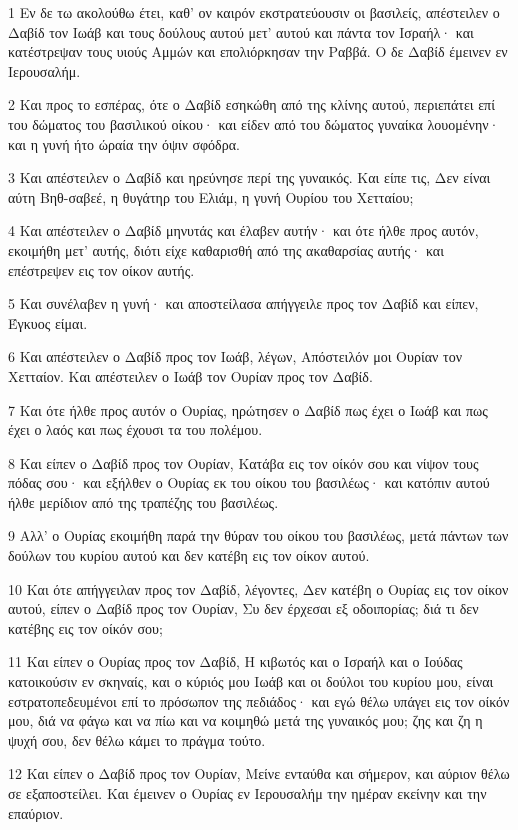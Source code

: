 \par 1 Εν δε τω ακολούθω έτει, καθ' ον καιρόν εκστρατεύουσιν οι βασιλείς, απέστειλεν ο Δαβίδ τον Ιωάβ και τους δούλους αυτού μετ' αυτού και πάντα τον Ισραήλ· και κατέστρεψαν τους υιούς Αμμών και επολιόρκησαν την Ραββά. Ο δε Δαβίδ έμεινεν εν Ιερουσαλήμ.
\par 2 Και προς το εσπέρας, ότε ο Δαβίδ εσηκώθη από της κλίνης αυτού, περιεπάτει επί του δώματος του βασιλικού οίκου· και είδεν από του δώματος γυναίκα λουομένην· και η γυνή ήτο ώραία την όψιν σφόδρα.
\par 3 Και απέστειλεν ο Δαβίδ και ηρεύνησε περί της γυναικός. Και είπε τις, Δεν είναι αύτη Βηθ-σαβεέ, η θυγάτηρ του Ελιάμ, η γυνή Ουρίου του Χετταίου;
\par 4 Και απέστειλεν ο Δαβίδ μηνυτάς και έλαβεν αυτήν· και ότε ήλθε προς αυτόν, εκοιμήθη μετ' αυτής, διότι είχε καθαρισθή από της ακαθαρσίας αυτής· και επέστρεψεν εις τον οίκον αυτής.
\par 5 Και συνέλαβεν η γυνή· και αποστείλασα απήγγειλε προς τον Δαβίδ και είπεν, Έγκυος είμαι.
\par 6 Και απέστειλεν ο Δαβίδ προς τον Ιωάβ, λέγων, Απόστειλόν μοι Ουρίαν τον Χετταίον. Και απέστειλεν ο Ιωάβ τον Ουρίαν προς τον Δαβίδ.
\par 7 Και ότε ήλθε προς αυτόν ο Ουρίας, ηρώτησεν ο Δαβίδ πως έχει ο Ιωάβ και πως έχει ο λαός και πως έχουσι τα του πολέμου.
\par 8 Και είπεν ο Δαβίδ προς τον Ουρίαν, Κατάβα εις τον οίκόν σου και νίψον τους πόδας σου· και εξήλθεν ο Ουρίας εκ του οίκου του βασιλέως· και κατόπιν αυτού ήλθε μερίδιον από της τραπέζης του βασιλέως.
\par 9 Αλλ' ο Ουρίας εκοιμήθη παρά την θύραν του οίκου του βασιλέως, μετά πάντων των δούλων του κυρίου αυτού και δεν κατέβη εις τον οίκον αυτού.
\par 10 Και ότε απήγγειλαν προς τον Δαβίδ, λέγοντες, Δεν κατέβη ο Ουρίας εις τον οίκον αυτού, είπεν ο Δαβίδ προς τον Ουρίαν, Συ δεν έρχεσαι εξ οδοιπορίας; διά τι δεν κατέβης εις τον οίκόν σου;
\par 11 Και είπεν ο Ουρίας προς τον Δαβίδ, Η κιβωτός και ο Ισραήλ και ο Ιούδας κατοικούσιν εν σκηναίς, και ο κύριός μου Ιωάβ και οι δούλοι του κυρίου μου, είναι εστρατοπεδευμένοι επί το πρόσωπον της πεδιάδος· και εγώ θέλω υπάγει εις τον οίκόν μου, διά να φάγω και να πίω και να κοιμηθώ μετά της γυναικός μου; ζης και ζη η ψυχή σου, δεν θέλω κάμει το πράγμα τούτο.
\par 12 Και είπεν ο Δαβίδ προς τον Ουρίαν, Μείνε ενταύθα και σήμερον, και αύριον θέλω σε εξαποστείλει. Και έμεινεν ο Ουρίας εν Ιερουσαλήμ την ημέραν εκείνην και την επαύριον.
